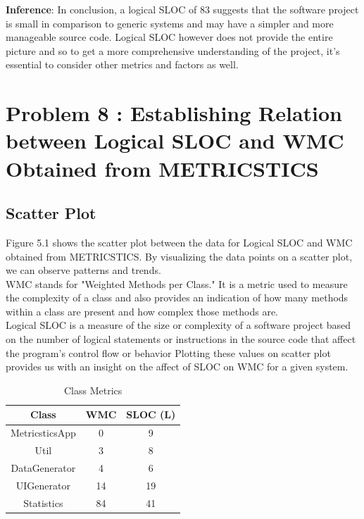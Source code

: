 \documentclass[12pt,letterpaper]{report}
\begin{document}
\textbf{Inference}: In conclusion, a logical SLOC of 83 suggests that the software project is small in comparison to generic systems and may have a simpler and more manageable source code. Logical SLOC however does not provide the entire picture and so to get a more comprehensive understanding of the project, it's essential to consider other metrics and factors as well.

\chapter{Problem 8 : Establishing Relation between Logical SLOC and WMC Obtained from METRICSTICS}

\section{Scatter Plot}
Figure 5.1 shows the scatter plot between the data for
Logical SLOC and WMC obtained from METRICSTICS.
By visualizing the data points on a scatter plot, we can observe patterns and trends.\\
WMC stands for "Weighted Methods per Class." It is a metric used to measure the complexity of a class and also provides an indication of how many methods within a class are present and how complex those methods are.\\
Logical SLOC is a measure of the size or complexity of a software project based on the number of logical statements or instructions in the source code that affect the program's control flow or behavior
Plotting these values on scatter plot provides us with an insight on the affect of SLOC on WMC for a given system.
\\
\begin{table}[htbp]
\centering

\begin{tabular}{|c|c|c|}
\hline
\textbf{Class} & \textbf{WMC} & \textbf{SLOC (L)} \\
\hline\hline\hline
MetricsticsApp & 0 & 9 \\
\hline
Util & 3 & 8 \\
\hline
DataGenerator & 4 & 6 \\
\hline
UIGenerator & 14 & 19 \\
\hline
Statistics & 84 & 41 \\
\hline
\end{tabular}
\caption{Class Metrics}
\end{table}
\end{document}
